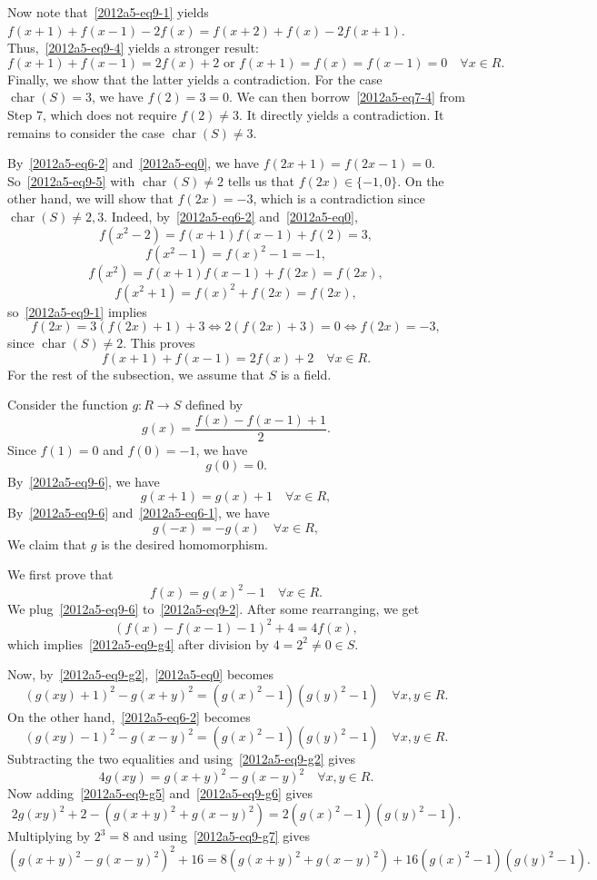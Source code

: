 \documentclass{article}
\DeclareMathOperator{\rchar}{char}
\begin{document}
Now note that~\eqref{2012a5-eq9-1} yields $f(x + 1) + f(x - 1) - 2 f(x) = f(x + 2) + f(x) - 2 f(x + 1)$.
Thus,~\eqref{2012a5-eq9-4} yields a stronger result:
\[ f(x + 1) + f(x - 1) = 2 f(x) + 2 \text{ or } f(x + 1) = f(x) = f(x - 1) = 0 \quad \forall x \in R. \tag{9.5}\label{2012a5-eq9-5} \]
Finally, we show that the latter yields a contradiction.
For the case $\rchar(S) = 3$, we have $f(2) = 3 = 0$.
We can then borrow~\eqref{2012a5-eq7-4} from Step 7, which does not require $f(2) \neq 3$.
It directly yields a contradiction.
It remains to consider the case $\rchar(S) \neq 3$.

By~\eqref{2012a5-eq6-2} and~\eqref{2012a5-eq0}, we have $f(2x + 1) = f(2x - 1) = 0$.
So~\eqref{2012a5-eq9-5} with $\rchar(S) \neq 2$ tells us that $f(2x) \in \{-1, 0\}$.
On the other hand, we will show that $f(2x) = -3$, which is a contradiction since $\rchar(S) \neq 2, 3$.
Indeed, by~\eqref{2012a5-eq6-2} and~\eqref{2012a5-eq0},
\[ f(x^2 - 2) = f(x + 1) f(x - 1) + f(2) = 3, \]
\[ f(x^2 - 1) = f(x)^2 - 1 = -1, \]
\[ f(x^2) = f(x + 1) f(x - 1) + f(2x) = f(2x), \]
\[ f(x^2 + 1) = f(x)^2 + f(2x) = f(2x), \]
    so~\eqref{2012a5-eq9-1} implies
\[ f(2x) = 3 (f(2x) + 1) + 3 \iff 2 (f(2x) + 3) = 0 \iff f(2x) = -3, \]
    since $\rchar(S) \neq 2$.
This proves
\[ f(x + 1) + f(x - 1) = 2 f(x) + 2 \quad \forall x \in R. \tag{9.6}\label{2012a5-eq9-6} \]
For the rest of the subsection, we assume that $S$ is a field.

Consider the function $g : R \to S$ defined by
\[ g(x) = \frac{f(x) - f(x - 1) + 1}{2}. \]
Since $f(1) = 0$ and $f(0) = -1$, we have
\[ g(0) = 0. \tag{9.g1}\label{2012a5-eq9-g1} \]
By~\eqref{2012a5-eq9-6}, we have
\[ g(x + 1) = g(x) + 1 \quad \forall x \in R, \tag{9.g2}\label{2012a5-eq9-g2} \]
By~\eqref{2012a5-eq9-6} and~\eqref{2012a5-eq6-1}, we have
\[ g(-x) = -g(x) \quad \forall x \in R, \tag{9.g3}\label{2012a5-eq9-g3} \]
We claim that $g$ is the desired homomorphism.

We first prove that
\[ f(x) = g(x)^2 - 1 \quad \forall x \in R. \tag{9.g4}\label{2012a5-eq9-g4} \]
We plug~\eqref{2012a5-eq9-6} to~\eqref{2012a5-eq9-2}.
After some rearranging, we get
\[ (f(x) - f(x - 1) - 1)^2 + 4 = 4 f(x), \]
    which implies~\eqref{2012a5-eq9-g4} after division by $4 = 2^2 \neq 0 \in S$.

Now, by~\eqref{2012a5-eq9-g2},~\eqref{2012a5-eq0} becomes
\[ (g(xy) + 1)^2 - g(x + y)^2 = (g(x)^2 - 1)(g(y)^2 - 1) \quad \forall x, y \in R. \tag{9.g5}\label{2012a5-eq9-g5} \]
On the other hand,~\eqref{2012a5-eq6-2} becomes
\[ (g(xy) - 1)^2 - g(x - y)^2 = (g(x)^2 - 1)(g(y)^2 - 1) \quad \forall x, y \in R. \tag{9.g6}\label{2012a5-eq9-g6} \]
Subtracting the two equalities and using~\eqref{2012a5-eq9-g2} gives
\[ 4 g(xy) = g(x + y)^2 - g(x - y)^2 \quad \forall x, y \in R. \tag{9.g7}\label{2012a5-eq9-g7} \]
Now adding~\eqref{2012a5-eq9-g5} and~\eqref{2012a5-eq9-g6} gives
\[ 2 g(xy)^2 + 2 - (g(x + y)^2 + g(x - y)^2) = 2 (g(x)^2 - 1)(g(y)^2 - 1). \]
Multiplying by $2^3 = 8$ and using~\eqref{2012a5-eq9-g7} gives
\[ (g(x + y)^2 - g(x - y)^2)^2 + 16 = 8(g(x + y)^2 + g(x - y)^2) + 16 (g(x)^2 - 1)(g(y)^2 - 1). \tag{9.g8}\label{2012a5-eq9-g8} \]
\end{document}
